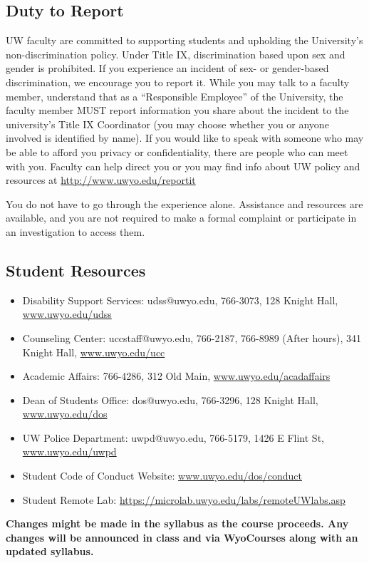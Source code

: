 \documentclass[11pt, letterpaper]{article}
\begin{document}
\subsection*{Duty to Report} UW faculty are committed to supporting students and upholding the University’s non-discrimination policy. Under Title IX, discrimination based upon sex and gender is prohibited. If you experience an incident of sex- or gender-based discrimination, we encourage you to report it. While you may talk to a faculty member, understand that as a “Responsible Employee” of the University, the faculty member MUST report information you share about the incident to the university’s Title IX Coordinator (you may choose whether you or anyone involved is identified by name). If you would like to speak with someone who may be able to afford you privacy or confidentiality, there are people who can meet with you. Faculty can help direct you or you may find info about UW policy and resources at \url{http://www.uwyo.edu/reportit}

You do not have to go through the experience alone. Assistance and resources are available, and you are not required to make a formal complaint or participate in an investigation to access them.

\subsection*{Student Resources}
\begin{itemize}[itemsep=0pt, topsep=0pt]
    \item Disability Support Services: udss@uwyo.edu, 766-3073, 128 Knight Hall, \url{www.uwyo.edu/udss}
    \item Counseling Center: uccstaff@uwyo.edu, 766-2187, 766-8989 (After hours), 341 Knight Hall, \url{www.uwyo.edu/ucc}
    \item Academic Affairs: 766-4286, 312 Old Main, \url{www.uwyo.edu/acadaffairs}
    \item Dean of Students Office: dos@uwyo.edu, 766-3296, 128 Knight Hall, \url{www.uwyo.edu/dos}
    \item UW Police Department: uwpd@uwyo.edu, 766-5179, 1426 E Flint St, \url{www.uwyo.edu/uwpd}
    \item Student Code of Conduct Website: \url{www.uwyo.edu/dos/conduct}
    \item Student Remote Lab: \url{https://microlab.uwyo.edu/labs/remoteUWlabs.asp}
\end{itemize}

\vspace{-10pt}
\begin{center}
\textbf{Changes might be made in the syllabus as the course proceeds. Any changes will be announced in class and via WyoCourses along with an updated syllabus.}
\end{center}
\end{document}
